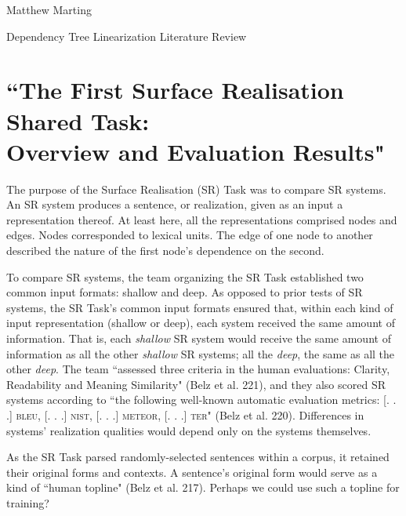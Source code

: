 \documentclass[12pt,letterpaper]{article}
\def \mylastname {Marting}
\def \myname {Matthew \mylastname{}}
\begin{document}
\begin{flushleft}
  \myname{}\\
  {\centering{}Dependency Tree Linearization Literature Review\par{}}
  \setlength{\parindent}{0.5in}
  \section*{``The First Surface Realisation Shared Task:\\
  Overview and Evaluation Results"}
  The purpose of the Surface Realisation (SR) Task was to compare SR systems. An SR system produces a sentence, or realization, given as an input a representation thereof. At least here, all the representations comprised nodes and edges. Nodes corresponded to lexical units. The edge of one node to another described the nature of the first node's dependence on the second.

  To compare SR systems, the team organizing the SR Task established two common input formats: shallow and deep. As opposed to prior tests of SR systems, the SR Task's common input formats ensured that, within each kind of input representation (shallow or deep), each system received the same amount of information. That is, each \textit{shallow} SR system would receive the same amount of information as all the other \textit{shallow} SR systems; all the \textit{deep}, the same as all the other \textit{deep}. The team ``assessed three criteria in the human evaluations: Clarity, Readability and Meaning Similarity" (Belz et al. 221), and they also scored SR systems according to ``the following well-known automatic evaluation metrics: [. . .] \textsc{bleu}, [. . .] \textsc{nist}, [. . .] \textsc{meteor}, [. . .] \textsc{ter}" (Belz et al. 220). Differences in systems' realization qualities would depend only on the systems themselves.

  As the SR Task parsed randomly-selected sentences within a corpus, it retained their original forms and contexts. A sentence's original form would serve as a kind of ``human topline" (Belz et al. 217). Perhaps we could use such a topline for training?


\end{flushleft}
\end{document}
